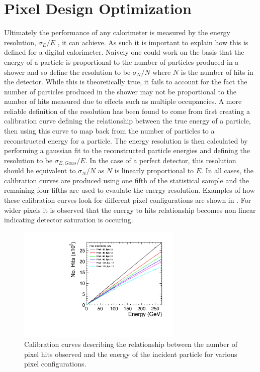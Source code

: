 \section{Pixel Design Optimization}

Ultimately the performance of any calorimeter is measured by the energy resolution, $\sigma_E/E$ , it can achieve. As such it is important to explain how this is defined for a digital calorimeter. Naively one could work on the basis that the energy of a particle is proportional to the number of particles produced in a shower and so define the resolution to be $\sigma_N/N$ where $N$ is the number of hits in the detector. While this is theoretically true, it fails to account for the fact the number of particles produced in the shower may not be proportional to the number of hits measured due to effects such as multiple occupancies. A more reliable definition of the resolution has been found to come from first creating a calibration curve defining the relationship between the true energy of a particle, then using this curve to map back from the number of particles to a reconstructed energy for a particle. The energy resolution is then calculated by performing a gaussian fit to the reconstructed particle energies and defining the resolution to be $\sigma_{E,Gaus}/E$. In the case of a perfect detector, this resolution should be equivalent to $\sigma_N/N$ as $N$ is linearly proportional to $E$. In all cases, the calibration curves are produced using one fifth of the statistical sample and the remaining four fifths are used to evaulate the energy resolution. Examples of how these calibration curves look for different pixel configurations are shown in . For wider pixels it is observed that the energy to hits relationship becomes non linear indicating detector saturation is occuring. 

\begin{figure}
  \centering
  \includegraphics[width=0.7\textwidth,keepaspectratio]{DECALStudies/fig/CalibrationCurves.pdf}
  \caption{Calibration curves describing the relationship between the number of pixel hits observed and the energy of the incident particle for various pixel configurations.}
  \label{fig:calibrationcurves}
\end{figure}

